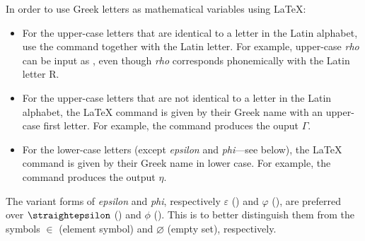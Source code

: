 \begin{latextip}
In order to use Greek letters as mathematical variables using \LaTeX{}:
\begin{itemize}
\item For the upper-case letters that are identical to a letter in the Latin alphabet, use the  command together with the Latin letter. For example, upper-case \textit{rho} can be input as , even though \textit{rho} corresponds phonemically with the Latin letter R.
\item For the upper-case letters that are not identical to a letter in the Latin alphabet, the \LaTeX{} command is given by their Greek name with an upper-case first letter. For example, the command  produces the ouput $\Gamma$.
\item For the lower-case letters (except \textit{epsilon} and \textit{phi}---see below), the \LaTeX{} command is given by their Greek name in lower case. For example, the command  produces the output $\eta$.
\end{itemize}
The variant forms of \textit{epsilon} and \textit{phi}, respectively $\varepsilon$ () and $\varphi$ (), are preferred over $\text{\straightepsilon}$ () and $\phi$ (). This is to better distinguish them from the symbols $\in$ (element symbol) and $\varnothing$ (empty set), respectively.
\end{latextip}


\todo{}